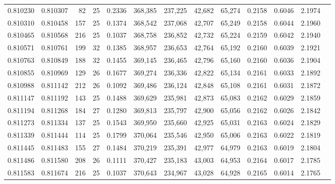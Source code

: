\begin{tabular}{rrrrrrrrrrrrr}
0.810230 & 0.810307 &    82 &  25 &                                     0.2336 & 368,385 & 237,225 &  42,682 &  65,274 & 0.2158 & 0.6046 & 2.1974 \\
0.810310 & 0.810458 &   157 &  25 &                                     0.1374 & 368,542 & 237,068 &  42,707 &  65,249 & 0.2158 & 0.6044 & 2.1960 \\
0.810465 & 0.810568 &   216 &  25 &                                     0.1037 & 368,758 & 236,852 &  42,732 &  65,224 & 0.2159 & 0.6042 & 2.1940 \\
0.810571 & 0.810761 &   199 &  32 &                                     0.1385 & 368,957 & 236,653 &  42,764 &  65,192 & 0.2160 & 0.6039 & 2.1921 \\
0.810763 & 0.810849 &   188 &  32 &                                     0.1455 & 369,145 & 236,465 &  42,796 &  65,160 & 0.2160 & 0.6036 & 2.1904 \\
0.810855 & 0.810969 &   129 &  26 &                                     0.1677 & 369,274 & 236,336 &  42,822 &  65,134 & 0.2161 & 0.6033 & 2.1892 \\
0.810988 & 0.811142 &   212 &  26 &                                     0.1092 & 369,486 & 236,124 &  42,848 &  65,108 & 0.2161 & 0.6031 & 2.1872 \\
0.811147 & 0.811192 &   143 &  25 &                                     0.1488 & 369,629 & 235,981 &  42,873 &  65,083 & 0.2162 & 0.6029 & 2.1859 \\
0.811194 & 0.811268 &   184 &  27 &                                     0.1280 & 369,813 & 235,797 &  42,900 &  65,056 & 0.2162 & 0.6026 & 2.1842 \\
0.811273 & 0.811334 &   137 &  25 &                                     0.1543 & 369,950 & 235,660 &  42,925 &  65,031 & 0.2163 & 0.6024 & 2.1829 \\
0.811339 & 0.811444 &   114 &  25 &                                     0.1799 & 370,064 & 235,546 &  42,950 &  65,006 & 0.2163 & 0.6022 & 2.1819 \\
0.811445 & 0.811483 &   155 &  27 &                                     0.1484 & 370,219 & 235,391 &  42,977 &  64,979 & 0.2163 & 0.6019 & 2.1804 \\
0.811486 & 0.811580 &   208 &  26 &                                     0.1111 & 370,427 & 235,183 &  43,003 &  64,953 & 0.2164 & 0.6017 & 2.1785 \\
0.811583 & 0.811674 &   216 &  25 &                                     0.1037 & 370,643 & 234,967 &  43,028 &  64,928 & 0.2165 & 0.6014 & 2.1765 \\

\end{tabular}
